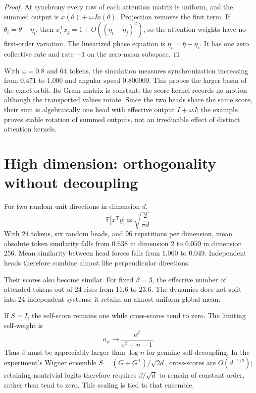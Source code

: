 \documentclass[11pt,a4paper]{article}
\theoremstyle{definition}
\newcommand{\T}{\mathsf T}
\newcommand{\e}{\mathrm e}
\begin{document}
\begin{proof}
At synchrony every row of each attention matrix is uniform, and the summed output is
$x(\theta)+\omega Jx(\theta)$.  Projection removes the first term.  If
$\theta_i=\theta+\eta_i$, then
$x_i^{\T}x_j=1+O((\eta_i-\eta_j)^2)$, so the attention weights have no first-order
variation.  The linearized phase equation is
$\dot\eta_i=\bar\eta-\eta_i$.  It has one zero collective rate and rate $-1$ on the
zero-mean subspace.
\end{proof}

With $\omega=0.8$ and 64 tokens, the simulation measures synchronization increasing
from $0.471$ to $1.000$ and angular speed $0.800000$.  This probes the larger basin of
the exact orbit.  Its Gram matrix is constant: the score kernel records no motion
although the transported values rotate.  Since the two heads share the same score,
their sum is algebraically one head with effective output $I+\omega J$; the example
proves stable rotation of summed outputs, not an irreducible effect of distinct
attention kernels.

\section{High dimension: orthogonality without decoupling}
\label{sec:dimension}

For two random unit directions in dimension $d$,
\[
 \mathbb E|x^{\T}y|\simeq\sqrt{\frac{2}{\pi d}}.
\]
With 24 tokens, six random heads, and 96 repetitions per dimension, mean absolute
token similarity falls from $0.638$ in dimension 2 to $0.050$ in dimension 256. Mean
similarity between head forces falls from $1.000$ to $0.049$. Independent heads
therefore combine almost like perpendicular directions.

Their scores also become similar. For fixed $\beta=3$, the effective number of
attended tokens out of 24 rises from $11.6$ to $23.6$. The dynamics does not split
into 24 independent systems; it retains an almost uniform global mean.

If $S=I$, the self-score remains one while cross-scores tend to zero. The limiting
self-weight is
\begin{equation}
 a_{ii}\longrightarrow\frac{\e^{\beta}}{\e^{\beta}+n-1}.\label{eq:self-mass}
\end{equation}
Thus $\beta$ must be appreciably larger than $\log n$ for genuine self-decoupling.
In the experiment's Wigner ensemble
$S=(G+G^{\T})/\sqrt{2d}$, cross-scores are $O(d^{-1/2})$; retaining nontrivial logits
therefore requires $\beta/\sqrt d$ to remain of constant order, rather than tend to
zero.  This scaling is tied to that ensemble.
\end{document}
